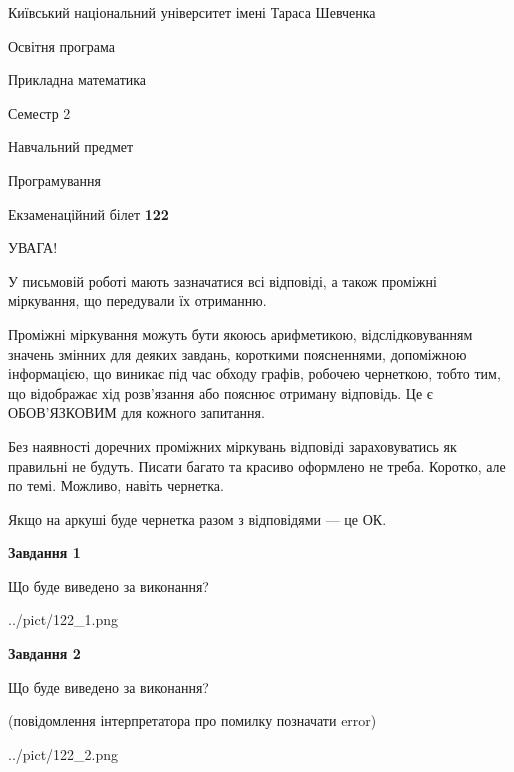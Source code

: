 \documentclass[12pt, ukrainian]{article}
\begin{document}
{{\begin {small}\par
{ \center  Київський національний університет імені Тараса Шевченка \par}
{\parbox {5 cm}{Освітня програма \hfill}{\parbox {7 cm}{Прикладна математика\hfill}}\parbox {6 cm}{\hfill Семестр 2}}\par
{\parbox {5 cm} {Навчальний предмет \hfill}\parbox {7 cm}{Програмування \hfill}\parbox {6cm}{\hfill}\par}\vspace{-7pt} \end{small}}{\center Екзаменаційний білет \No \textbf
{ 122 }\par}}
{
\begin {large}
УВАГА!

У письмовій роботі мають зазначатися всі відповіді, а також проміжні міркування, що передували їх отриманню.

Проміжні міркування можуть бути якоюсь арифметикою, відслідковуванням зна\-чень змінних для деяких завдань,
короткими поясненнями, допоміжною інформацією, що виникає під час обходу графів, робочею чернеткою,
тобто тим, що відображає хід розв’язання або пояснює отриману відповідь.
Це є ОБОВ’ЯЗКОВИМ для кожного запитання.

Без наявності доречних проміжних міркувань відповіді зараховуватись як правиль\-ні не будуть.
Писати багато та красиво оформлено не треба. Коротко, але по темі. Можли\-во, навіть чернетка.

Якщо на аркуші буде чернетка разом з відповідями --- це ОК.

\newpage

{\begin {center}\textbf{Завдання 1}\end {center}}\par
Що буде виведено за виконання?\par
\begin{center}
	{../pict/122_1.png}
\end{center}
\newpage

{\begin {center}\textbf{Завдання 2}\end {center}}\par
Що буде виведено за виконання?\par
 (повідомлення інтерпретатора про помилку позначати error)\par
\begin{center}
	{../pict/122_2.png}
\end{center}
\newpage


\end{large}}
\end{document}

